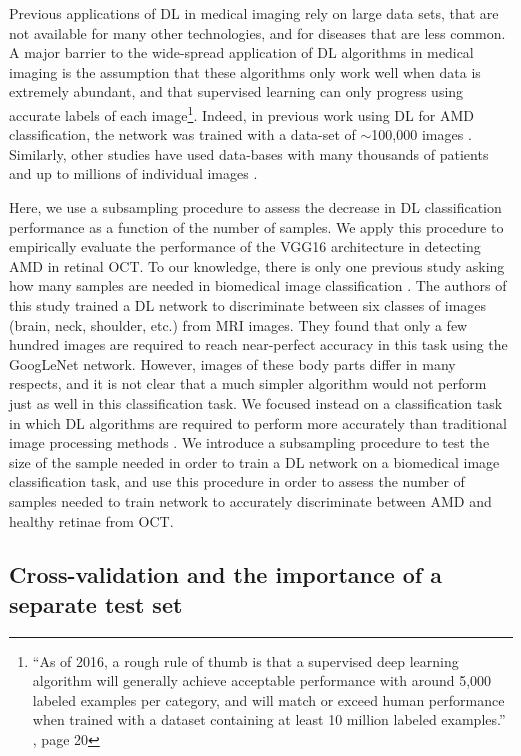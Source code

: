 Previous applications of DL in medical imaging rely on large data sets, that
are not available for many other technologies, and for diseases that are less
common. A major barrier to the wide-spread application of DL algorithms in
medical imaging is the assumption that these algorithms only work well when
data is extremely abundant, and that supervised learning can only progress using
accurate labels of each image\footnote{``As of 2016, a rough rule of thumb is
that a supervised deep learning algorithm will generally achieve acceptable
performance with around 5,000 labeled examples per category, and will match or
exceed human performance when trained with a dataset containing at least 10
million labeled examples.'' \citep{Goodfellow-et-al-2016}, page 20}. Indeed, in
previous work using DL for AMD classification, the network was trained with a
data-set of $\sim$100,000 images \citep{lee2017deep}. Similarly, other studies
have used data-bases with many thousands of patients and up to millions of
individual images \citep{Kermany2018-bq}.

Here, we use a subsampling procedure to assess the decrease in DL
classification performance as a function of the number of samples. We apply this
procedure to empirically evaluate the performance of the VGG16 architecture in
detecting AMD in retinal OCT. To our knowledge, there is only one previous
study asking how many samples are needed in biomedical image classification
\citep{Cho2015data_size}. The authors of this study trained a DL network to
discriminate between six classes of images (brain, neck, shoulder, etc.) from
MRI images. They found that only a few hundred images are required to reach
near-perfect accuracy in this task using the GoogLeNet network. However, images
of these body parts differ in many respects, and it is not clear that a much
simpler algorithm would not perform just as well in this classification task.
We focused instead on a classification task in which DL algorithms are required
to perform more accurately than traditional image processing methods
\citep{Lemaitre2016-gu}. We introduce a subsampling procedure to test the size
of the sample needed in order to train a DL network on a biomedical image
classification task, and use this procedure in order to assess the number of
samples needed to train network to accurately discriminate between AMD and
healthy retinae from OCT.

\subsection{Cross-validation and the importance of a separate test set}

